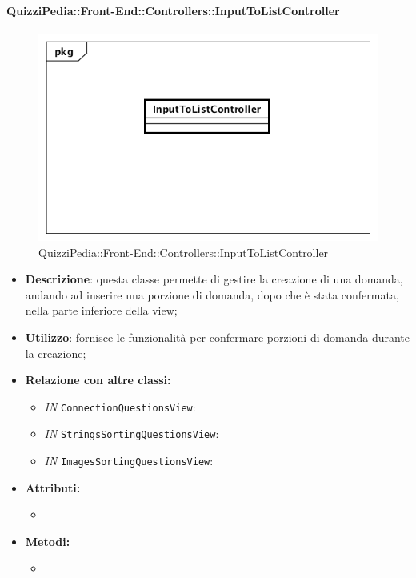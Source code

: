 \paragraph{QuizziPedia::Front-End::Controllers::InputToListController}
\begin{figure}
	\centering
	\includegraphics[scale=0.45]{UML/Classi/Front-End/QuizziPedia_Front-end_Controller_InputToListController.png}
	\caption{QuizziPedia::Front-End::Controllers::InputToListController}
\end{figure}
\begin{itemize}
	\item \textbf{Descrizione}: questa classe permette di gestire la creazione di una domanda, andando ad inserire una porzione di domanda, dopo che è stata confermata, nella parte inferiore della view;
	\item \textbf{Utilizzo}: fornisce le funzionalità per confermare porzioni di domanda durante la creazione;
	\item \textbf{Relazione con altre classi:}
	\begin{itemize}
		\item \textit{IN} \texttt{ConnectionQuestionsView}:
		\item \textit{IN} \texttt{StringsSortingQuestionsView}:  
		\item \textit{IN} \texttt{ImagesSortingQuestionsView}:    
	\end{itemize}
	\item \textbf{Attributi:}
	\begin{itemize}
		\item 
	\end{itemize}
	\item \textbf{Metodi:}
	\begin{itemize}
		\item 
	\end{itemize}
\end{itemize}


